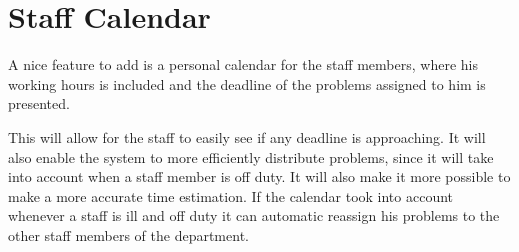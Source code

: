 \section{Staff Calendar}
\label{sec:staffCalendar}
A nice feature to add is a personal calendar for the staff members, where his working hours is included and the deadline of the problems assigned to him is presented. 

This will allow for the staff to easily see if any deadline is approaching. 
It will also enable the system to more efficiently distribute problems, since it will take into account when a staff member is off duty. It will also make it more possible to make a more accurate time estimation. 
If the calendar took into account whenever a staff is ill and off duty it can automatic reassign his problems to the other staff members of the department.
